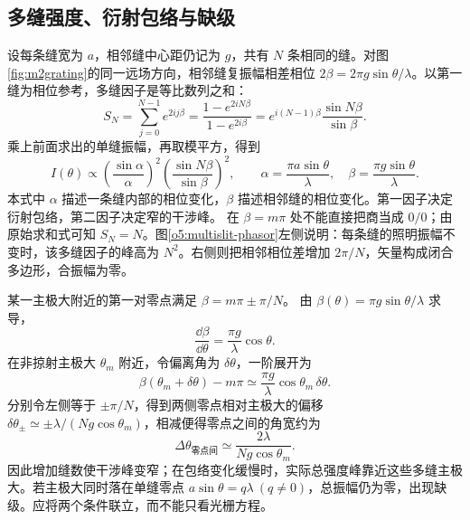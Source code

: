 \subsection{多缝强度、衍射包络与缺级}
设每条缝宽为 $a$，相邻缝中心距仍记为 $g$，共有 $N$ 条相同的缝。对图\ref{fig:m2grating}的同一远场方向，相邻缝复振幅相差相位 $2\beta=2\pi g\sin\theta/\lambda$。以第一缝为相位参考，多缝因子是等比数列之和：
\[
 S_N=\sum_{j=0}^{N-1}e^{2ij\beta}
 =\frac{1-e^{2iN\beta}}{1-e^{2i\beta}}
 =e^{i(N-1)\beta}\frac{\sin N\beta}{\sin\beta}.
\]
乘上前面求出的单缝振幅，再取模平方，得到
\[
 I(\theta)\propto
 \left(\frac{\sin\alpha}{\alpha}\right)^2
 \left(\frac{\sin N\beta}{\sin\beta}\right)^2,
 \qquad \alpha=\frac{\pi a\sin\theta}{\lambda},\quad
 \beta=\frac{\pi g\sin\theta}{\lambda}.
\]
本式中 $\alpha$ 描述一条缝内部的相位变化，$\beta$ 描述相邻缝的相位变化。第一因子决定衍射包络，第二因子决定窄的干涉峰。
在 $\beta=m\pi$ 处不能直接把商当成 $0/0$；由原始求和式可知 $S_N=N$。图\ref{o5:multislit-phasor}左侧说明：每条缝的照明振幅不变时，该多缝因子的峰高为 $N^2$。右侧则把相邻相位差增加 $2\pi/N$，矢量构成闭合多边形，合振幅为零。

某一主极大附近的第一对零点满足 $\beta=m\pi\pm\pi/N$。
由 $\beta(\theta)=\pi g\sin\theta/\lambda$ 求导，
\[
\frac{\dd\beta}{\dd\theta}=\frac{\pi g}{\lambda}\cos\theta.
\]
在非掠射主极大 $\theta_m$ 附近，令偏离角为 $\delta\theta$，一阶展开为
\[
\beta(\theta_m+\delta\theta)-m\pi
\simeq\frac{\pi g}{\lambda}\cos\theta_m\,\delta\theta.
\]
分别令左侧等于 $\pm\pi/N$，得到两侧零点相对主极大的偏移
$\delta\theta_\pm\simeq\pm\lambda/(Ng\cos\theta_m)$，相减便得零点之间的角宽约为
\[
 \Delta\theta_{\text{零点间}}
 \simeq\frac{2\lambda}{Ng\cos\theta_m}.
\]
因此增加缝数使干涉峰变窄；在包络变化缓慢时，实际总强度峰靠近这些多缝主极大。若主极大同时落在单缝零点 $a\sin\theta=q\lambda\ (q\ne0)$，总振幅仍为零，出现缺级。应将两个条件联立，而不能只看光栅方程。

